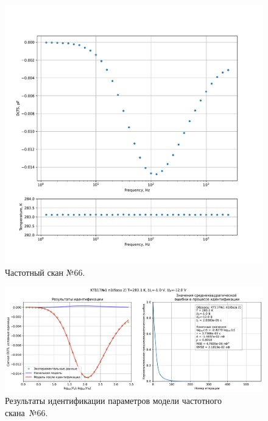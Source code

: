 \begin{figure}[!ht]
    \centering
    \includegraphics[width=1\textwidth]{../plots/КТ117№1_п1(база 2)_2500Гц-1Гц_1пФ_+10С_-1В-12В_200мВ_20мкс_шаг_0,1.pdf}
    \caption{Частотный скан №66.}
    \label{pic:frequency_scan_66}
\end{figure}

\begin{figure}[!ht]
    \centering
    \includegraphics[width=1\textwidth]{../plots/КТ117№1_п1(база 2)_2500Гц-1Гц_1пФ_+10С_-1В-12В_200мВ_20мкс_шаг_0,1_model.pdf}
    \caption{Результаты идентификации параметров модели частотного скана~№66.}
    \label{pic:frequency_scan_model66}
\end{figure}

\pagebreak



